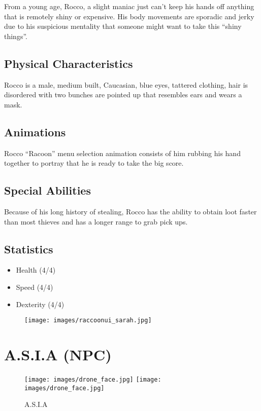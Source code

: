 \documentclass[11pt]{report}
\begin{document}
From a young age, Rocco, a slight maniac just can’t keep his hands off anything that is remotely shiny or expensive. His body movements are sporadic and jerky due to his suspicious mentality that someone might want to take this ``shiny things''.

\subsection{Physical Characteristics}

Rocco is a male, medium built, Caucasian, blue eyes, tattered clothing, hair is disordered with two bunches are pointed up that resembles ears and wears a mask.

\subsection{Animations}

Rocco ``Racoon'' menu selection animation consists of him rubbing his hand together to portray that he is ready to take the big score.

\subsection{Special Abilities}

Because of his long history of stealing, Rocco has the ability to obtain loot faster than most thieves and has a longer range to grab pick ups.

\subsection{Statistics}
\begin{itemize}
    \item Health (4/4)
    \item Speed (4/4)
    \item Dexterity (4/4)
\end{itemize}

\begin{figure}
    \centering
    \texttt{[image: images/raccoonui\_sarah.jpg]}
    \caption{}
\end{figure}

\section{A.S.I.A (NPC)}

\begin{figure}[H]
    \centering
    \texttt{[image: images/drone\_face.jpg]}
    \texttt{[image: images/drone\_face.jpg]}
    \caption{A.S.I.A}
\end{figure}
\end{document}
